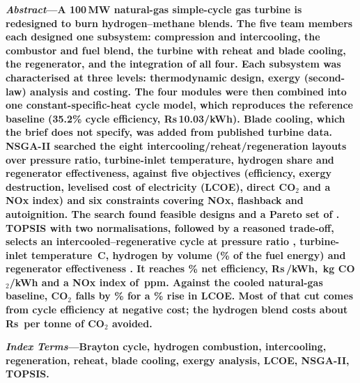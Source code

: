 \documentclass[10pt,a4paper,twocolumn]{article}
\newcommand{\Rs}{Rs\,}
\begin{document}

\noindent\textbf{\textit{Abstract}---A 100\,MW natural-gas simple-cycle gas turbine is redesigned to burn hydrogen--methane blends. The five team members each designed one subsystem: compression and intercooling, the combustor and fuel blend, the turbine with reheat and blade cooling, the regenerator, and the integration of all four. Each subsystem was characterised at three levels: thermodynamic design, exergy (second-law) analysis and costing. The four modules were then combined into one constant-specific-heat cycle model, which reproduces the reference baseline (35.2\% cycle efficiency, \Rs10.03/kWh). Blade cooling, which the brief does not specify, was added from published turbine data. NSGA-II searched the eight intercooling/reheat/regeneration layouts over pressure ratio, turbine-inlet temperature, hydrogen share and regenerator effectiveness, against five objectives (efficiency, exergy destruction, levelised cost of electricity (LCOE), direct CO$_2$ and a NOx index) and six constraints covering NOx, flashback and autoignition. The search found \nFeas{} feasible designs and a Pareto set of \nPareto. TOPSIS with two normalisations, followed by a reasoned trade-off, selects an \textbf{intercooled--regenerative cycle at pressure ratio \finPR, turbine-inlet temperature \finTITC\,\textdegree C, \finX{} hydrogen by volume (\finE\% of the fuel energy) and regenerator effectiveness \finEps}. It reaches \finEta\% net efficiency, \Rs\finLCOE/kWh, \finCO\,kg CO$_2$/kWh and a NOx index of \finNOx\,ppm. Against the cooled natural-gas baseline, CO$_2$ falls by \dCOpct\% for a \dLpct\% rise in LCOE. Most of that cut comes from cycle efficiency at negative cost; the hydrogen blend costs about \Rs\abateHtwo{} per tonne of CO$_2$ avoided.}

\vspace{0.4em}
\noindent\textbf{\textit{Index Terms}---Brayton cycle, hydrogen combustion, intercooling, regeneration, reheat, blade cooling, exergy analysis, LCOE, NSGA-II, TOPSIS.}
\end{document}
